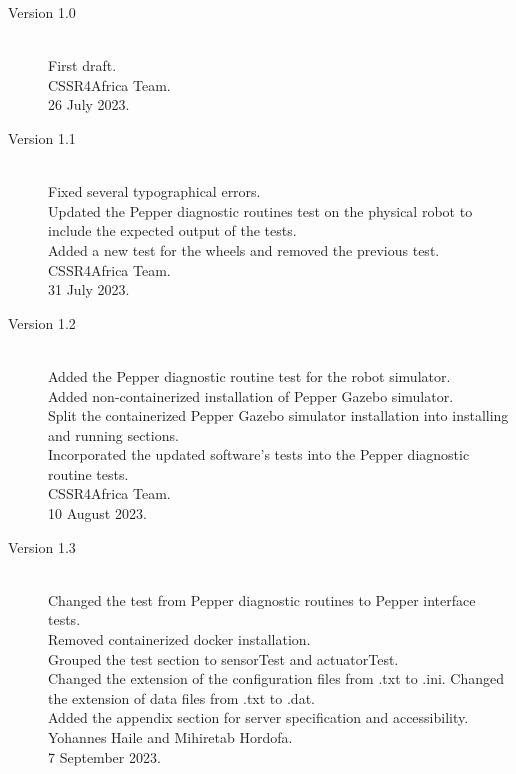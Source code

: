 \documentclass{CSSRforAfrica}
\begin{document}
{\begin{description}

\item [Version 1.0]~\\
First draft. \\
CSSR4Africa Team. \\ %
26 July 2023. %

\item [Version 1.1]~\\
Fixed several typographical errors.\\
Updated the Pepper diagnostic routines test on the physical robot to include the expected output of the tests.\\
Added a new test for the wheels and removed the previous test.\\
CSSR4Africa Team.\\
31 July 2023.

\item [Version 1.2]~\\
Added the Pepper diagnostic routine test for the robot simulator.\\
Added non-containerized installation of Pepper Gazebo simulator.\\
Split the containerized Pepper Gazebo simulator installation into installing and running sections.\\
Incorporated the updated software's tests into the Pepper diagnostic routine tests.\\
CSSR4Africa Team.\\
10 August 2023.

\item [Version 1.3]~\\
Changed the test from Pepper diagnostic routines to Pepper interface tests.\\
Removed containerized docker installation.\\
Grouped the test section to sensorTest and actuatorTest.\\
Changed the extension of the configuration files from .txt to .ini. Changed the extension of data files from .txt to .dat. \\
Added the appendix section for server specification and accessibility.\\
Yohannes Haile and Mihiretab Hordofa.\\
7 September 2023.


\end{description}}
\end{document}
